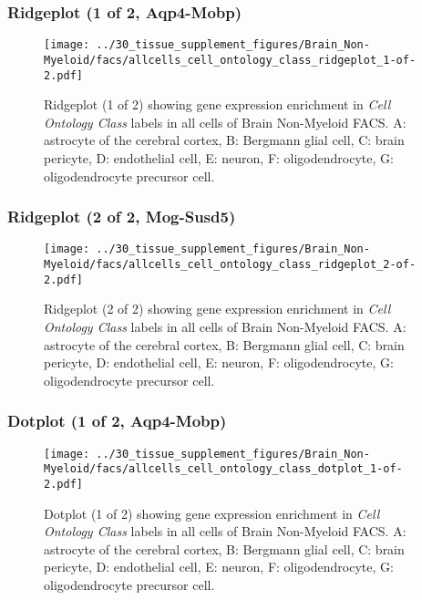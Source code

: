 \clearpage

\subsubsection{Ridgeplot (1 of 2, Aqp4-Mobp)}
\begin{figure}[h]
\centering
\texttt{[image: ../30\_tissue\_supplement\_figures/Brain\_Non-Myeloid/facs/allcells\_cell\_ontology\_class\_ridgeplot\_1-of-2.pdf]}

\caption{ Ridgeplot (1 of 2)  showing gene expression enrichment in \emph{Cell Ontology Class} labels in all cells of Brain Non-Myeloid FACS. A: astrocyte of the cerebral cortex, B: Bergmann glial cell, C: brain pericyte, D: endothelial cell, E: neuron, F: oligodendrocyte, G: oligodendrocyte precursor cell.}
\end{figure}


\clearpage

\subsubsection{Ridgeplot (2 of 2, Mog-Susd5)}
\begin{figure}[h]
\centering
\texttt{[image: ../30\_tissue\_supplement\_figures/Brain\_Non-Myeloid/facs/allcells\_cell\_ontology\_class\_ridgeplot\_2-of-2.pdf]}

\caption{ Ridgeplot (2 of 2)  showing gene expression enrichment in \emph{Cell Ontology Class} labels in all cells of Brain Non-Myeloid FACS. A: astrocyte of the cerebral cortex, B: Bergmann glial cell, C: brain pericyte, D: endothelial cell, E: neuron, F: oligodendrocyte, G: oligodendrocyte precursor cell.}
\end{figure}


\clearpage

\subsubsection{Dotplot (1 of 2, Aqp4-Mobp)}
\begin{figure}[h]
\centering
\texttt{[image: ../30\_tissue\_supplement\_figures/Brain\_Non-Myeloid/facs/allcells\_cell\_ontology\_class\_dotplot\_1-of-2.pdf]}

\caption{ Dotplot (1 of 2)  showing gene expression enrichment in \emph{Cell Ontology Class} labels in all cells of Brain Non-Myeloid FACS. A: astrocyte of the cerebral cortex, B: Bergmann glial cell, C: brain pericyte, D: endothelial cell, E: neuron, F: oligodendrocyte, G: oligodendrocyte precursor cell.}
\end{figure}


